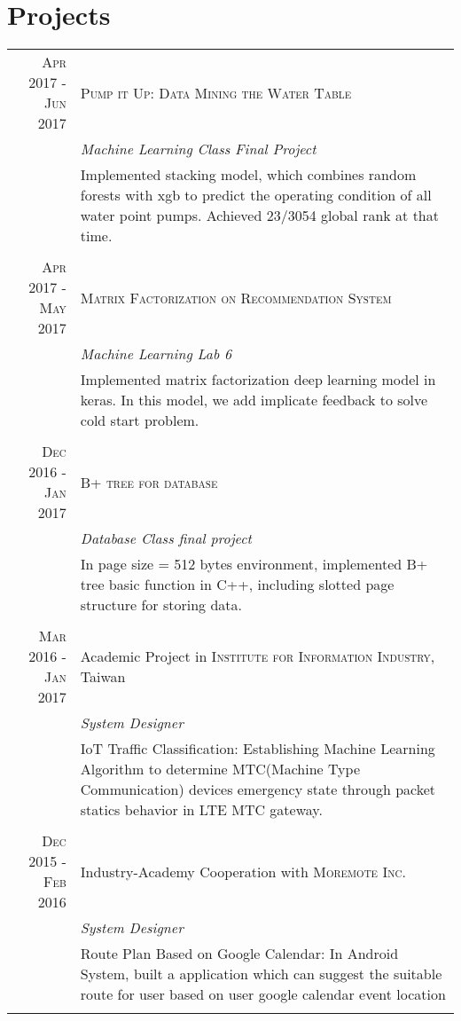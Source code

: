 \documentclass[a4paper,10pt]{article}
\begin{document}
 
\section{Projects}
\begin{tabular}{r|p{10.3cm}}

\textsc{Apr 2017 - Jun 2017} & \textsc{Pump it Up: Data Mining the Water Table}\\
 &\emph{Machine Learning Class Final Project}\\
&\footnotesize{Implemented stacking model, which combines random forests with xgb to predict the operating condition of all water point pumps. Achieved 23/3054 global rank at that time.}\\
\multicolumn{2}{c}{} \\

\textsc{Apr 2017 - May 2017} & \textsc{Matrix Factorization on Recommendation System}\\
&\emph{Machine Learning Lab 6}\\
&\footnotesize{Implemented matrix factorization deep learning model in keras. In this model, we add implicate feedback to solve cold start problem.}\\
 \multicolumn{2}{c}{} \\

  \textsc{Dec 2016 - Jan 2017} & \textsc{B+ tree for database} \\
 &\emph{Database Class final project}\\
 &\footnotesize{In page size = 512 bytes environment, implemented B+ tree basic function in C++, including slotted page structure for storing data.}\\\multicolumn{2}{c}{} \\
 
 \textsc{Mar 2016 - Jan 2017} & Academic Project in \textsc{Institute for Information Industry}, Taiwan \\
 &\emph{System Designer}\\
 &\footnotesize{IoT Traffic Classification: Establishing Machine Learning Algorithm to determine MTC(Machine Type Communication) devices emergency state through packet statics behavior in LTE MTC gateway.}\\\multicolumn{2}{c}{} \\
 
\textsc{Dec 2015 - Feb 2016} & Industry-Academy Cooperation with \textsc{Moremote Inc.}\\
 &\emph{System Designer}\\
 &\footnotesize{Route Plan Based on Google Calendar: In Android System, built a application which can suggest the suitable route for user based on user google calendar event location}\\\multicolumn{2}{c}{} \\


\end{tabular}
\end{document}
